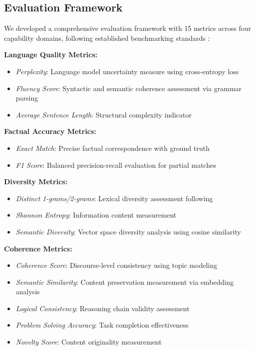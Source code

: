 \documentclass{article}
\begin{document}
\subsection{Evaluation Framework}

We developed a comprehensive evaluation framework with 15 metrics across four capability domains, following established benchmarking standards \citep{liang2022holistic,hendrycks2020measuring}:

\textbf{Language Quality Metrics:}
\begin{itemize}
\item \textit{Perplexity}: Language model uncertainty measure using cross-entropy loss
\item \textit{Fluency Score}: Syntactic and semantic coherence assessment via grammar parsing
\item \textit{Average Sentence Length}: Structural complexity indicator
\end{itemize}

\textbf{Factual Accuracy Metrics:}
\begin{itemize}
\item \textit{Exact Match}: Precise factual correspondence with ground truth
\item \textit{F1 Score}: Balanced precision-recall evaluation for partial matches
\end{itemize}

\textbf{Diversity Metrics:}
\begin{itemize}
\item \textit{Distinct 1-grams/2-grams}: Lexical diversity assessment following \citet{li2016diversity}
\item \textit{Shannon Entropy}: Information content measurement \citep{shannon1948mathematical}
\item \textit{Semantic Diversity}: Vector space diversity analysis using cosine similarity
\end{itemize}

\textbf{Coherence Metrics:}
\begin{itemize}
\item \textit{Coherence Score}: Discourse-level consistency using topic modeling
\item \textit{Semantic Similarity}: Content preservation measurement via embedding analysis
\item \textit{Logical Consistency}: Reasoning chain validity assessment
\item \textit{Problem Solving Accuracy}: Task completion effectiveness
\item \textit{Novelty Score}: Content originality measurement
\end{itemize}
\end{document}
